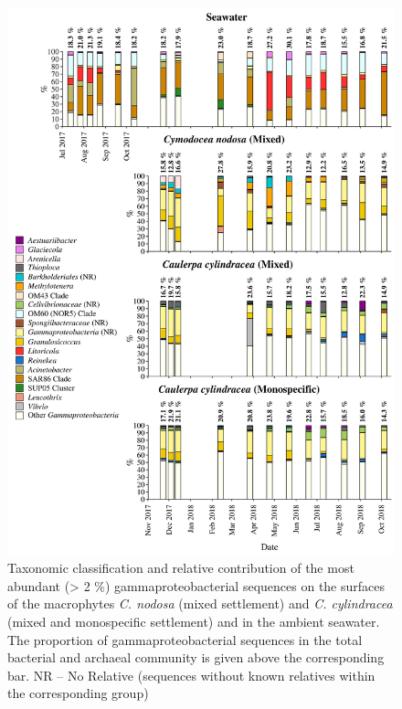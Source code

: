 \documentclass[12pt,]{article}
\begin{document}
\begin{figure}[H]

{\centering \includegraphics[width=0.85\linewidth]{../results/figures/gammaproteobacteria_bar_plot} 

}

\caption{Taxonomic classification and relative contribution of the most abundant (> 2 \si{\percent}) gammaproteobacterial sequences on the surfaces of the macrophytes \textit{C. nodosa} (mixed settlement) and \textit{C. cylindracea} (mixed and monospecific settlement) and in the ambient seawater. The proportion of gammaproteobacterial sequences in the total bacterial and archaeal community is given above the corresponding bar. NR -- No Relative (sequences without known relatives within the corresponding group)\label{gamma}}\label{fig:unnamed-chunk-8}
\end{figure}
\end{document}
